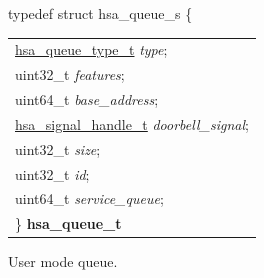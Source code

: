 \documentclass[final]{book}
\newcommand{\reffld}[1]{\textit{#1}}
\begin{document}
\noindent\begin{tcolorbox}[breakable,nobeforeafter,arc=0mm,colframe=white,colback=lightgray,left=0mm]
typedef struct  hsa_queue_s \{
\vspace{-3.5mm}\begin{longtable}{@{}p{\textwidth}}
\hspace{1.7em}\hyperlink{group__queue_1gaf1939f228a41fa6ee50cffd4de03b561}{hsa_queue_type_t} \reffld{type};\\
\hspace{1.7em}uint32_t \reffld{features};\\
\hspace{1.7em}uint64_t \reffld{base_address};\\
\hspace{1.7em}\hyperlink{group__signals_1ga6592c136d70853d855bc11d9efdbf534}{hsa_signal_handle_t} \reffld{doorbell_signal};\\
\hspace{1.7em}uint32_t \reffld{size};\\
\hspace{1.7em}uint32_t \reffld{id};\\
\hspace{1.7em}uint64_t \reffld{service_queue};\\
\}  \hypertarget{group__queue_1gacbb2835331f18aee30ee441f07b3fc5a}{\textbf{hsa_queue_t}}
\end{longtable}

\end{tcolorbox}
User mode queue.
\end{document}
